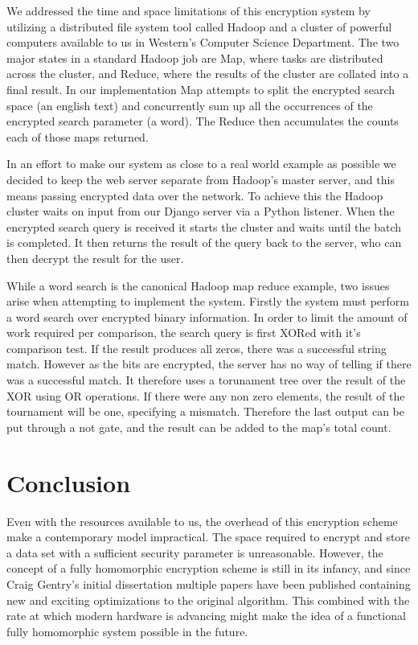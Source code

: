 \documentclass[letterpaper,11pt]{article} %
\begin{document}
 We addressed the time and space limitations of this encryption system by utilizing a distributed file system tool called Hadoop and a cluster of powerful computers available to us in Western's Computer Science Department. The two major states in a standard Hadoop job are Map, where tasks are distributed across the cluster, and Reduce, where the results of the cluster are collated into a final result. In our implementation Map attempts to split the encrypted search space (an english text) and concurrently sum up all the occurrences of the encrypted search parameter (a word). The Reduce then accumulates the counts each of those maps returned. 

In an effort to make our system as close to a real world example as possible we decided to keep the web server separate from Hadoop's master server, and this means passing encrypted data over the network. To achieve this the Hadoop cluster waits on input from our Django server via a Python listener. When the encrypted search query is received it starts the cluster and waits until the batch is completed. It then returns the result of the query back to the server, who can then decrypt the result for the user. 

While a word search is the canonical Hadoop map reduce example, two issues arise when attempting to implement the system. Firstly the system must perform a word search over encrypted binary information. In order to limit the amount of work required per comparison, the search query is first XORed with it's comparison test. If the result produces all zeros, there was a successful string match. However as the bits are encrypted, the server has no way of telling if there was a successful match. It therefore uses a torunament tree over the result of the XOR using OR operations. If there were any non zero elements, the result of the tournament will be one, specifying a mismatch. Therefore the last output can be put through a not gate, and the result can be added to the map's total count.
\section*{Conclusion}

Even with the resources available to us, the overhead of this encryption scheme make a contemporary model impractical. The space required to encrypt and store a data set with a sufficient security parameter is unreasonable. However, the concept of a fully homomorphic encryption scheme is still in its infancy, and since Craig Gentry's initial dissertation multiple papers have been published containing new and exciting optimizations to the original algorithm. This combined with the rate at which modern hardware is advancing might make the idea of a functional fully homomorphic system possible in the future. \\ \\ \\
\end{document}
